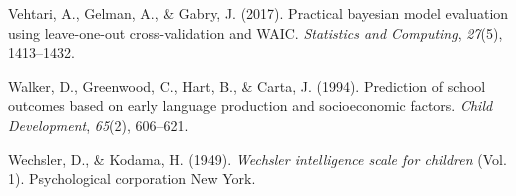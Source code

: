 \documentclass[
  man,floatsintext]{apa6}
\newlength{\cslhangindent}
\newlength{\cslentryspacingunit} %
\newenvironment{CSLReferences}[2] %
 {%
  \setlength{\parindent}{0pt}
  \ifodd #1
  \let\oldpar\par
  \def\par{\hangindent=\cslhangindent\oldpar}
  \fi
  \setlength{\parskip}{#2\cslentryspacingunit}
 }%
 {}
\begin{document}
\begin{CSLReferences}{1}{0}
\leavevmode{}%
Vehtari, A., Gelman, A., \& Gabry, J. (2017). Practical bayesian model evaluation using leave-one-out cross-validation and WAIC. \emph{Statistics and Computing}, \emph{27}(5), 1413--1432.

\leavevmode{}%
Walker, D., Greenwood, C., Hart, B., \& Carta, J. (1994). Prediction of school outcomes based on early language production and socioeconomic factors. \emph{Child Development}, \emph{65}(2), 606--621.

\leavevmode{}%
Wechsler, D., \& Kodama, H. (1949). \emph{Wechsler intelligence scale for children} (Vol. 1). Psychological corporation New York.

\end{CSLReferences}
\end{document}
